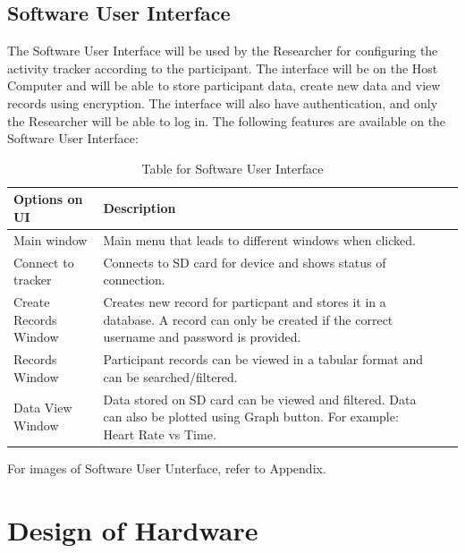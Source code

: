 \documentclass[12pt, titlepage]{article}
\begin{document}
\subsection{Software User Interface}

The Software User Interface will be used by the Researcher for configuring the activity tracker according to the participant. The interface will be on the Host Computer and will be able to store participant data, create new data and view records using encryption. The interface will also have authentication, and only the Researcher will be able to log in. The following features are available on the Software User Interface:

\begin{table}[H]
	\begin{tabularx}{1.05\textwidth} { 
		  | >{\centering\arraybackslash}X 
		  | >{\centering\arraybackslash}X 
		  | >{\centering\arraybackslash}X 
		  | >{\centering\arraybackslash}X | }
		 \hline
		 Options on UI & Description\\
		 \hline
		Main window & Main menu that leads to different windows when clicked.\\
		\hline
		 Connect to tracker  & Connects to SD card for device and shows status of connection.\\
		 \hline
		   Create Records Window & Creates new record for particpant and stores it in a database. A record can only be created if the correct username and password is provided. \\
		\hline 
		Records Window & Participant records can be viewed in a tabular format and can be searched/filtered.\\
		\hline
		Data View Window & Data stored on SD card can be viewed and filtered. Data can also be plotted using Graph button. For example: Heart Rate vs Time.\\
		\hline
	\end{tabularx}
\caption{\label{Software User Interface}Table for Software User Interface}  
\end{table}

For images of Software User Unterface, refer to Appendix.


\section{Design of Hardware}
\end{document}
